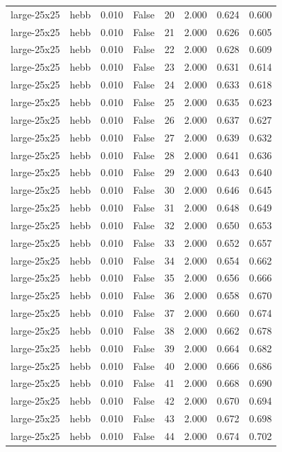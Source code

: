 \begin{tabular}{llrrrrrr}
large-25x25 & hebb & 0.010 & False & 20 & 2.000 & 0.624 & 0.600 \\
large-25x25 & hebb & 0.010 & False & 21 & 2.000 & 0.626 & 0.605 \\
large-25x25 & hebb & 0.010 & False & 22 & 2.000 & 0.628 & 0.609 \\
large-25x25 & hebb & 0.010 & False & 23 & 2.000 & 0.631 & 0.614 \\
large-25x25 & hebb & 0.010 & False & 24 & 2.000 & 0.633 & 0.618 \\
large-25x25 & hebb & 0.010 & False & 25 & 2.000 & 0.635 & 0.623 \\
large-25x25 & hebb & 0.010 & False & 26 & 2.000 & 0.637 & 0.627 \\
large-25x25 & hebb & 0.010 & False & 27 & 2.000 & 0.639 & 0.632 \\
large-25x25 & hebb & 0.010 & False & 28 & 2.000 & 0.641 & 0.636 \\
large-25x25 & hebb & 0.010 & False & 29 & 2.000 & 0.643 & 0.640 \\
large-25x25 & hebb & 0.010 & False & 30 & 2.000 & 0.646 & 0.645 \\
large-25x25 & hebb & 0.010 & False & 31 & 2.000 & 0.648 & 0.649 \\
large-25x25 & hebb & 0.010 & False & 32 & 2.000 & 0.650 & 0.653 \\
large-25x25 & hebb & 0.010 & False & 33 & 2.000 & 0.652 & 0.657 \\
large-25x25 & hebb & 0.010 & False & 34 & 2.000 & 0.654 & 0.662 \\
large-25x25 & hebb & 0.010 & False & 35 & 2.000 & 0.656 & 0.666 \\
large-25x25 & hebb & 0.010 & False & 36 & 2.000 & 0.658 & 0.670 \\
large-25x25 & hebb & 0.010 & False & 37 & 2.000 & 0.660 & 0.674 \\
large-25x25 & hebb & 0.010 & False & 38 & 2.000 & 0.662 & 0.678 \\
large-25x25 & hebb & 0.010 & False & 39 & 2.000 & 0.664 & 0.682 \\
large-25x25 & hebb & 0.010 & False & 40 & 2.000 & 0.666 & 0.686 \\
large-25x25 & hebb & 0.010 & False & 41 & 2.000 & 0.668 & 0.690 \\
large-25x25 & hebb & 0.010 & False & 42 & 2.000 & 0.670 & 0.694 \\
large-25x25 & hebb & 0.010 & False & 43 & 2.000 & 0.672 & 0.698 \\
large-25x25 & hebb & 0.010 & False & 44 & 2.000 & 0.674 & 0.702 \\

\end{tabular}
